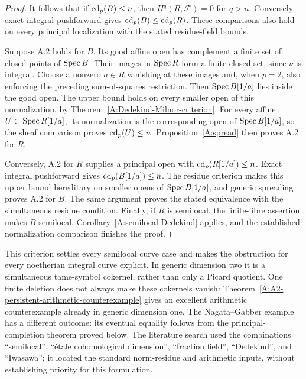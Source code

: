 \begin{proof}
It follows that if $\operatorname{cd}_p(B)\leq n$, then
$H^q(R,\mathcal F)=0$ for $q>n$. Conversely exact integral
pushforward gives $\operatorname{cd}_p(B)\leq\operatorname{cd}_p(R)$. These comparisons
also hold on every principal localization with the stated
residue-field bounds.

Suppose A.2 holds for $B$. Its good affine open has complement
a finite set of closed points of $\operatorname{Spec} B$. Their images in
$\operatorname{Spec} R$ form a finite closed set, since $\nu$ is integral.
Choose a nonzero $a\in R$ vanishing at these images and, when
$p=2$, also enforcing the preceding sum-of-squares restriction.
Then $\operatorname{Spec} B[1/a]$ lies inside the good open. The upper bound
holds on every smaller open of this normalization, by
Theorem~\ref{A:Dedekind-Milnor-criterion}. For every affine
$U\subset\operatorname{Spec} R[1/a]$, its normalization is the corresponding
open of $\operatorname{Spec} B[1/a]$, so the sheaf comparison proves
$\operatorname{cd}_p(U)\leq n$. Proposition~\ref{A:spread} then proves A.2
for $R$.

Conversely, A.2 for $R$ supplies a principal open with
$\operatorname{cd}_p(R[1/a])\leq n$. Exact integral pushforward gives
$\operatorname{cd}_p(B[1/a])\leq n$. The residue criterion makes this upper
bound hereditary on smaller opens of $\operatorname{Spec} B[1/a]$, and generic
spreading proves A.2 for $B$. The same argument proves the stated
equivalence with the simultaneous residue condition. Finally, if
$R$ is semilocal, the finite-fibre assertion makes $B$ semilocal.
Corollary~\ref{A:semilocal-Dedekind} applies, and the established
normalization comparison finishes the proof.
\end{proof}

\begin{remark}
This criterion settles every semilocal curve case and makes the obstruction
for every noetherian integral curve explicit. In generic dimension two it is
a simultaneous tame-symbol cokernel, rather than only a Picard
quotient. One finite deletion does not always make these cokernels
vanish: Theorem~\ref{A:A2-persistent-arithmetic-counterexample} gives
an excellent arithmetic counterexample already in generic dimension
one. The Nagata--Gabber example has a different outcome: its
eventual equality follows from the principal-completion theorem
proved below. The literature search used
the combinations ``semilocal'', ``\'etale cohomological dimension'',
``fraction field'', ``Dedekind'', and ``Iwasawa''; it located the
standard norm-residue and arithmetic inputs, without establishing
priority for this formulation.
\end{remark}
